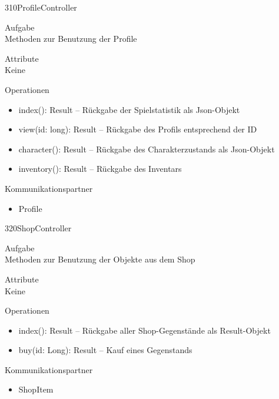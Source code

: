 \newpage
\begin{class}{310}{ProfileController}
\item[Aufgabe]~\\
Methoden zur Benutzung der Profile
\item[Attribute]~\\
Keine
\item[Operationen]~\\
\begin{itemize}
\item index(): Result -- Rückgabe der Spielstatistik als Json-Objekt
\item view(id: long): Result -- Rückgabe des Profils entsprechend der ID
\item character(): Result -- Rückgabe des Charakterzustands als Json-Objekt
\item inventory(): Result -- Rückgabe des Inventars
\end{itemize}
\item[Kommunikationspartner]~\\
\begin{itemize}
\item Profile
\end{itemize}
\end{class}

\newpage
\begin{class}{320}{ShopController}
\item[Aufgabe]~\\
Methoden zur Benutzung der Objekte aus dem Shop
\item[Attribute]~\\
Keine
\item[Operationen]~\\
\begin{itemize}
\item index(): Result -- Rückgabe aller Shop-Gegenstände als Result-Objekt
\item buy(id: Long): Result -- Kauf eines Gegenstands
\end{itemize}
\item[Kommunikationspartner]~\\
\begin{itemize}
\item ShopItem
\end{itemize}
\end{class}

